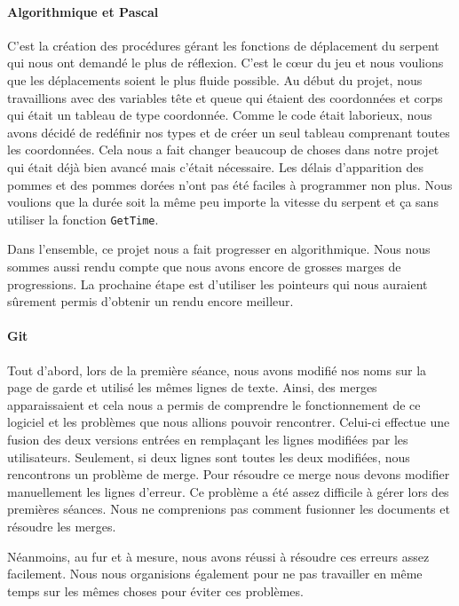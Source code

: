                 \paragraph{Algorithmique et Pascal} 
                    C'est la création des procédures gérant les fonctions de déplacement du serpent qui nous ont demandé le plus de réflexion. C'est le cœur du jeu et nous voulions que les déplacements soient le plus fluide possible. Au début du projet, nous travaillions avec des variables tête et queue qui étaient des coordonnées et corps qui était un tableau de type coordonnée. Comme le code était laborieux, nous avons décidé de redéfinir nos types et de créer un seul tableau comprenant toutes les coordonnées. Cela nous a fait changer beaucoup de choses dans notre projet qui était déjà bien avancé mais c'était nécessaire. 
                    Les délais d'apparition des pommes et des pommes dorées n'ont pas été faciles à programmer non plus. Nous voulions que la durée soit la même peu importe la vitesse du serpent et ça sans utiliser la fonction \verb|GetTime|. 
                    
                    Dans l'ensemble, ce projet nous a fait progresser en algorithmique. Nous nous sommes aussi rendu compte que nous avons encore de grosses marges de progressions. La prochaine étape est d'utiliser les pointeurs qui nous auraient sûrement permis d'obtenir un rendu encore meilleur. 
            
                \clearpage
                
                \paragraph{Git} 
                    Tout d'abord, lors de la première séance, nous avons modifié nos noms sur la page de garde et utilisé les mêmes lignes de texte. Ainsi, des merges apparaissaient et cela nous a permis de comprendre le fonctionnement de ce logiciel et les problèmes que nous allions pouvoir rencontrer. Celui-ci effectue une fusion des deux versions entrées en remplaçant les lignes modifiées par les utilisateurs. Seulement, si deux lignes sont toutes les deux modifiées, nous rencontrons un problème de merge. Pour résoudre ce merge nous devons modifier manuellement les lignes d'erreur. Ce problème a été assez difficile à gérer lors des premières séances. Nous ne comprenions pas comment fusionner les documents et résoudre les merges.
            
                    Néanmoins, au fur et à mesure, nous avons réussi à résoudre ces erreurs assez facilement. Nous nous organisions également pour ne pas travailler en même temps sur les mêmes choses pour éviter ces problèmes. 
            
